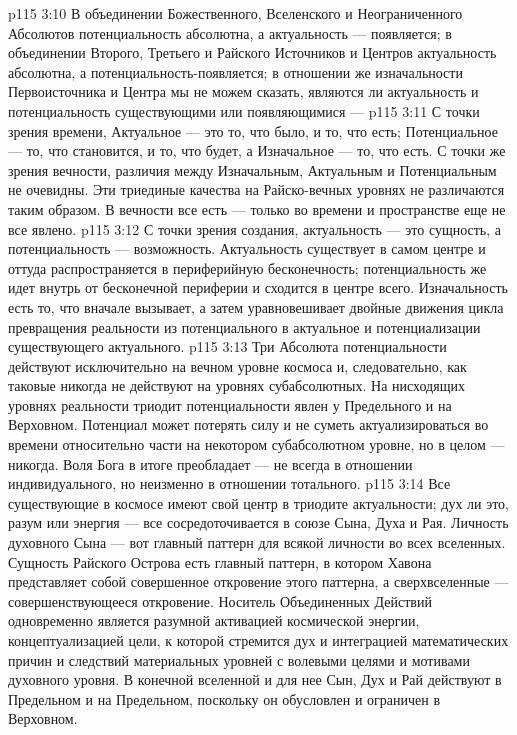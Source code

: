 \vs p115 3:10 В объединении Божественного, Вселенского и Неограниченного Абсолютов потенциальность абсолютна, а актуальность --- появляется; в объединении Второго, Третьего и Райского Источников и Центров актуальность абсолютна, а потенциальность\hyp{}появляется; в отношении же изначальности Первоисточника и Центра мы не можем сказать, являются ли актуальность и потенциальность существующими или появляющимися --- 
\vs p115 3:11 С точки зрения времени, Актуальное --- это то, что было, и то, что есть; Потенциальное --- то, что становится, и то, что будет, а Изначальное --- то, что есть. С точки же зрения вечности, различия между Изначальным, Актуальным и Потенциальным не очевидны. Эти триединые качества на Райско\hyp{}вечных уровнях не различаются таким образом. В вечности все есть --- только во времени и пространстве еще не все явлено.
\vs p115 3:12 С точки зрения создания, актуальность --- это сущность, а потенциальность --- возможность. Актуальность существует в самом центре и оттуда распространяется в периферийную бесконечность; потенциальность же идет внутрь от бесконечной периферии и сходится в центре всего. Изначальность есть то, что вначале вызывает, а затем уравновешивает двойные движения цикла превращения реальности из потенциального в актуальное и потенциализации существующего актуального.
\vs p115 3:13 Три Абсолюта потенциальности действуют исключительно на вечном уровне космоса и, следовательно, как таковые никогда не действуют на уровнях субабсолютных. На нисходящих уровнях реальности триодит потенциальности явлен у Предельного и на Верховном. Потенциал может потерять силу и не суметь актуализироваться во времени относительно части на некотором субабсолютном уровне, но в целом --- никогда. Воля Бога в итоге преобладает --- не всегда в отношении индивидуального, но неизменно в отношении тотального.
\vs p115 3:14 Все существующие в космосе имеют свой центр в триодите актуальности; дух ли это, разум или энергия --- все сосредоточивается в союзе Сына, Духа и Рая. Личность духовного Сына --- вот главный паттерн для всякой личности во всех вселенных. Сущность Райского Острова есть главный паттерн, в котором Хавона представляет собой совершенное откровение этого паттерна, а сверхвселенные --- совершенствующееся откровение. Носитель Объединенных Действий одновременно является разумной активацией космической энергии, концептуализацией цели, к которой стремится дух и интеграцией математических причин и следствий материальных уровней с волевыми целями и мотивами духовного уровня. В конечной вселенной и для нее Сын, Дух и Рай действуют в Предельном и на Предельном, поскольку он обусловлен и ограничен в Верховном.
